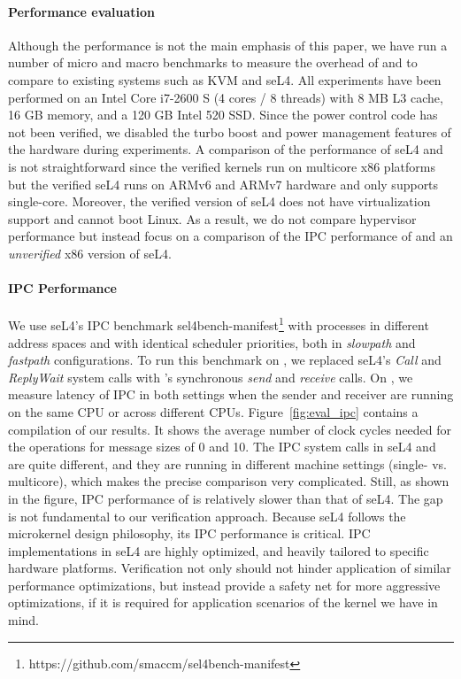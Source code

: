 \vspace{-4pt}
\paragraph{Performance evaluation} 
Although the performance is not the main emphasis of this paper, we
have run a number of micro and macro benchmarks to measure the
overhead of {\mCTOS} and to compare {\mCTOS} to existing systems such
as KVM and seL4. All experiments have been performed on an Intel Core
i7-2600 S (4 cores / 8 threads) with 8 MB L3 cache, 16 GB memory, and
a 120 GB Intel 520 SSD. Since the power control code has not been
verified, we disabled the turbo boost and power management features of
the hardware during experiments.
A comparison of the performance of seL4 and \mCTOShyper{} is not
straightforward since the verified \mCTOS{} kernels run on 
multicore
x86
platforms but the verified seL4 runs on ARMv6
and ARMv7 hardware and only supports single-core. Moreover, the
verified version of seL4 does not have virtualization support and
cannot boot Linux. As a result, we do not compare hypervisor
performance but instead focus on a comparison of the IPC performance
of {\mCTOS} and an \emph{unverified} x86 version of seL4.

\vspace{-4pt}
\paragraph{IPC Performance}
We use seL4's IPC benchmark
sel4bench-manifest\footnote{https://github.com/smaccm/sel4bench-manifest}
with processes in different address spaces and with identical
scheduler priorities, both in \emph{slowpath} and \emph{fastpath}
configurations. To run this benchmark on {\mCTOS}, we replaced seL4's
\emph{Call} and \emph{ReplyWait} system calls with \mCTOS's
synchronous \emph{send} and \emph{receive} calls.  On {\mCTOS}, we
measure latency of IPC in both settings when the sender and receiver
are running on the same CPU or across different CPUs.
Figure~\ref{fig:eval_ipc} contains a compilation of our results. It
shows the average number of clock cycles needed for the operations for
message sizes of 0 and 10. The IPC system calls in seL4 and {\mCTOS}
are quite different, and they are running in different machine
settings (single- vs. multicore), which makes the precise
comparison very complicated.  Still, as shown in the figure, IPC
performance of {\mCTOS} is relatively slower than that of seL4. The
gap is not fundamental to our verification approach.  Because seL4
follows the microkernel design philosophy, its IPC performance is
critical. IPC implementations in seL4 are highly optimized, and
heavily tailored to specific hardware platforms.
Verification not only
should not hinder application of similar performance optimizations,
but instead provide a safety net for more aggressive optimizations, if
it is required for application scenarios of the kernel we have in
mind.

